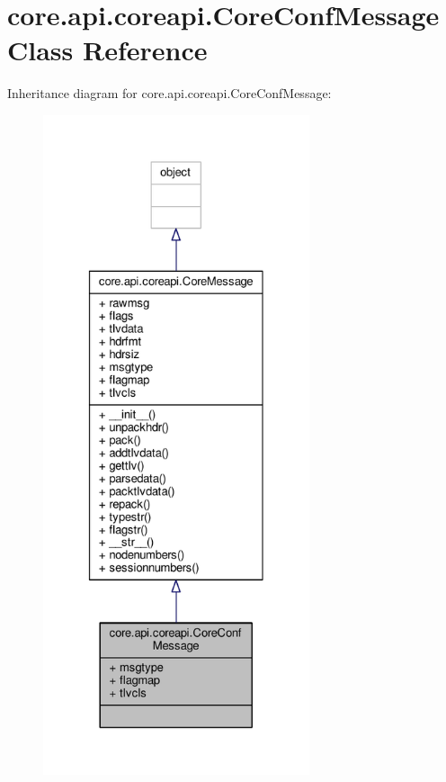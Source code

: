 \hypertarget{classcore_1_1api_1_1coreapi_1_1_core_conf_message}{\section{core.\+api.\+coreapi.\+Core\+Conf\+Message Class Reference}
\label{classcore_1_1api_1_1coreapi_1_1_core_conf_message}
}


Inheritance diagram for core.\+api.\+coreapi.\+Core\+Conf\+Message\+:
\nopagebreak
\begin{figure}[H]
\begin{center}
\leavevmode
\includegraphics[height=550pt]{classcore_1_1api_1_1coreapi_1_1_core_conf_message__inherit__graph}
\end{center}
\end{figure}


